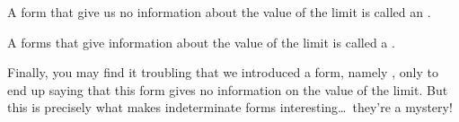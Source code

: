 \documentclass{ximera}
\begin{document}
\begin{definition}
A form that give us no information about the value of the limit is
called an .

A forms that give information about the value of the limit is called a
.
\end{definition}  

Finally, you may find it troubling that we introduced a form, namely
\zeroOverZero, only to end up saying that this form gives no information on the
value of the limit. But this is precisely what makes
indeterminate forms interesting\dots~they're a mystery!
\end{document}
